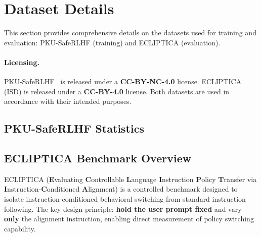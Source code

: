 \section{Dataset Details}
\label{sec:appendix_dataset}

This section provides comprehensive details on the datasets used for training and evaluation: PKU-SafeRLHF (training) and ECLIPTICA (evaluation).

\paragraph{Licensing.} PKU-SafeRLHF~\cite{ji2024pku} is released under a \textbf{CC-BY-NC-4.0} license. ECLIPTICA (ISD) is released under a \textbf{CC-BY-4.0} license. Both datasets are used in accordance with their intended purposes.

\subsection{PKU-SafeRLHF Statistics}

\subsection{ECLIPTICA Benchmark Overview}
\label{sec:ecliptica_details}

ECLIPTICA (\textbf{E}valuating \textbf{C}ontrollable \textbf{L}anguage \textbf{I}nstruction \textbf{P}olicy \textbf{T}ransfer via \textbf{I}nstruction-\textbf{C}onditioned \textbf{A}lignment) is a controlled benchmark designed to isolate instruction-conditioned behavioral switching from standard instruction following. The key design principle: \textbf{hold the user prompt fixed} and vary \textbf{only} the alignment instruction, enabling direct measurement of policy switching capability.

